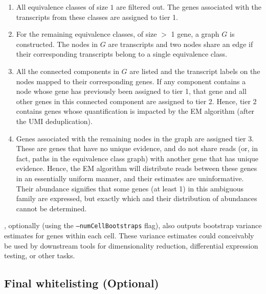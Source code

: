 \begin{enumerate}
  \item All equivalence classes of size $1$ are filtered out. The genes associated with the transcripts from these classes are assigned to tier 1.
  \item For the remaining equivalence classes, of size $>$ 1 gene, a graph $G$ is constructed. The nodes in $G$ are transcripts and two nodes share an edge if their corresponding transcripts belong to a single equivalence class. 
  \item All the connected components in $G$ are listed and the transcript labels on the nodes mapped to their corresponding genes. If any component contains a node whose gene has previously been assigned to tier 1, that gene and all other genes in this connected component are assigned to tier 2. Hence, tier 2 contains genes whose quantification is impacted by the EM algorithm (after the UMI deduplication). 
  \item Genes associated with the remaining nodes in the graph are assigned tier 3. These are genes that have no unique evidence, and do not share reads (or, in fact, paths in the equivalence class graph) with another gene that has unique evidence. Hence, the EM algorithm will distribute reads between these genes in an essentially uniform manner, and their estimates are uninformative.  Their abundance signifies that some genes (at least 1) in this ambiguous family are expressed, but exactly which and their distribution of abundances cannot be determined. 
\end{enumerate}

\Alevin, optionally (using the \texttt{--numCellBootstraps} flag), also outputs bootstrap variance estimates for genes within each cell. These variance estimates could conceivably be used by downstream tools for dimensionality reduction, differential expression testing, or other tasks. 

\subsection{Final whitelisting (Optional)}
\label{sec:final_whitelisting}

